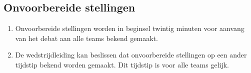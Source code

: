 \subsection{Onvoorbereide stellingen}

\begin{enumerate}
\item Onvoorbereide stellingen worden in beginsel twintig minuten voor aanvang van het debat aan alle teams bekend gemaakt.
\item De wedstrijdleiding kan beslissen dat onvoorbereide stellingen op een ander tijdstip bekend worden gemaakt. Dit tijdstip is voor alle teams gelijk.
\end{enumerate}
